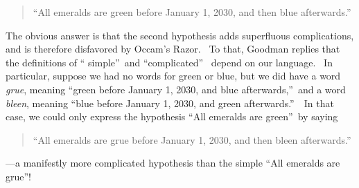 \documentclass[12pt,onecolumn]{article}%
\begin{document}
\begin{quotation}
\noindent\textquotedblleft All emeralds are green before January 1, 2030, and
then blue afterwards.\textquotedblright
\end{quotation}

The obvious answer is that the second hypothesis adds superfluous
complications, and is therefore disfavored by Occam's Razor. \ To that,
Goodman replies that the definitions of \textquotedblleft
simple\textquotedblright\ and \textquotedblleft complicated\textquotedblright%
\ depend on our language. \ In particular, suppose we had no words for green
or blue, but we did have a word \textit{grue}, meaning \textquotedblleft green
before January 1, 2030, and blue afterwards,\textquotedblright\ and a word
\textit{bleen}, meaning \textquotedblleft blue before January 1, 2030, and
green afterwards.\textquotedblright\ \ In that case, we could only express the
hypothesis \textquotedblleft All emeralds are green\textquotedblright\ by saying

\begin{quotation}
\noindent\textquotedblleft All emeralds are grue before January 1, 2030, and
then bleen afterwards.\textquotedblright
\end{quotation}

\noindent---a manifestly more complicated hypothesis than the simple
\textquotedblleft All emeralds are grue\textquotedblright!
\end{document}
